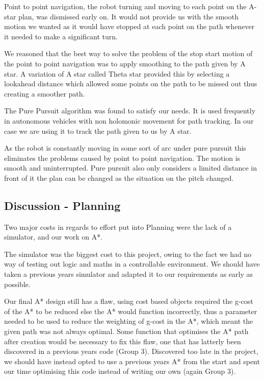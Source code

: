 Point to point navigation, the robot turning and moving to each point on the
A-star plan, was dismissed early on. It would not provide us with the smooth
motion we wanted as it would have stopped at each point on the path whenever it
needed to make a significant turn.

We reasoned that the best way to solve the problem of the stop start motion of
the point to point navigation was to apply smoothing to the path given by
A star. A variation of A star called Theta star provided this by selecting
a lookahead distance which allowed some points on the path to be missed out
thus creating a smoother path.

The Pure Pursuit algorithm was found to satisfy our needs. It is used
frequently in autonomous vehicles with non holomonic
movement for path tracking\cite{agvpp}\cite{coulterpp}. In our case we are
using it to track the path given to us by A star.

As the robot is constantly moving in some sort of arc under pure pursuit this
eliminates the problems caused by point to point navigation. The motion is
smooth and uninterrupted. Pure pursuit also only considers a limited distance
in front of it the plan can be changed as the situation on the pitch changed.

\subsection{Discussion - Planning}


Two major costs in regards to effort put into Planning were the lack of a 
simulator, and our work on A*. 

The simulator was the biggest cost to this project, owing to the fact we had
no way of testing out logic and maths in a controllable environment. We should
have taken a previous years simulator and adapted it to our requirements as
early as possible. 

Our final A* design still has a flaw, using cost based objects required the 
g-cost of the A* to be reduced else the A* would function incorrectly, thus a 
parameter needed to be used to reduce the weighting of g-cost in the A*, which 
meant the given path was not always optimal. Some function that optimises the A* 
path after creation would be necessary to fix this flaw, one that has latterly 
been discovered in a previous years code (Group 3). Discovered too late 
in the project, we should have instead opted to use a previous years A* from the 
start and spent our time optimising this code instead of writing our own 
(again Group 3).

